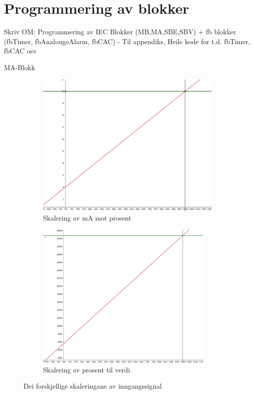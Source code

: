 \section{Programmering av blokker}
\thispagestyle{fancy}

Skriv OM:
Programmering av IEC Blokker (MB,MA,SBE,SBV) 
+ fb blokker (fbTimer, fbAnalougeAlarm, fbCAC)
- Til appendiks, Heile kode for t.d. fbTimer, fbCAC osv




MA-Blokk

\begin{figure}[htbp]
    \centering
    \begin{subfigure}[b]{0.45\textwidth}
        \centering
        \includegraphics[width=1\textwidth]{Bilder/4_20mA_Scaling.png}
        \caption{Skalering av mA mot prosent}\label{fig:Skalering av mA mot prosent}
    \end{subfigure}
    \hfill
    \begin{subfigure}[b]{0.45\textwidth}
        \centering
        \includegraphics[width=0.95\textwidth]{Bilder/27327_prosent_Scaling.png}
        \caption{Skalering av prosent til verdi}\label{fig:Skalering av prosent til verdi}
    \end{subfigure}
    \caption{Dei forskjellige skaleringane av inngangssignal}\label{fig:Skalering av prosent til verdi}
\end{figure}